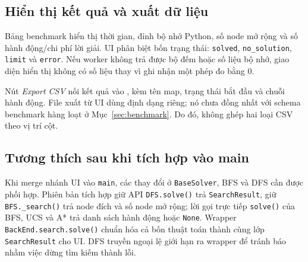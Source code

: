 \subsection{Hiển thị kết quả và xuất dữ liệu}

Bảng benchmark hiển thị thời gian, đỉnh bộ nhớ Python, số node mở rộng và
số hành động/chi phí lời giải. UI phân biệt bốn trạng thái:
\texttt{solved}, \texttt{no\_solution}, \texttt{limit} và \texttt{error}.
Nếu worker không trả được bộ đếm hoặc số liệu bộ nhớ, giao diện hiển thị
không có số liệu thay vì ghi nhận một phép đo bằng 0.

Nút \textit{Export CSV} nối kết quả vào ,
kèm tên map, trạng thái bắt đầu và chuỗi hành động. File xuất từ UI dùng
định dạng riêng; nó chưa đồng nhất với schema benchmark hàng loạt ở
Mục~\ref{sec:benchmark}. Do đó, không ghép hai loại CSV theo vị trí cột.

\subsection{Tương thích sau khi tích hợp vào main}

Khi merge nhánh UI vào \texttt{main}, các thay đổi ở \texttt{BaseSolver},
BFS và DFS cần được phối hợp. Phiên bản tích hợp giữ API
\texttt{DFS.solve()} trả \texttt{SearchResult}, giữ
\texttt{BFS.\_search()} trả node đích và số node mở rộng; lời gọi trực tiếp
\texttt{solve()} của BFS, UCS và A* trả danh sách hành động hoặc
\texttt{None}. Wrapper \texttt{BackEnd.search.solve()} chuẩn hóa cả bốn
thuật toán thành cùng lớp \texttt{SearchResult} cho UI. DFS truyền ngoại
lệ giới hạn ra wrapper để tránh báo nhầm việc dừng tìm kiếm thành lỗi.
